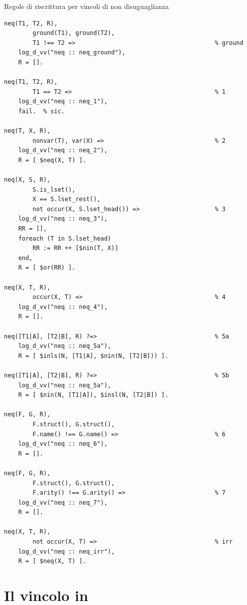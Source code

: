 \documentclass[12pt,a4paper,openright]{book} %
\begin{document}
\begin{algorithm}[H]
	\caption{Regole di riscrittura per vincoli di non disuguaglianza}
	\label{alg:neq_constraints}
\end{algorithm}
\begin{verbatim}
neq(T1, T2, R),
        ground(T1), ground(T2),
    	T1 !== T2 =>                                       % ground
    log_d_vv("neq :: neq_ground"),
    R = [].

neq(T1, T2, R),
        T1 == T2 =>                                        % 1
    log_d_vv("neq :: neq_1"),
    fail.  % sic.

neq(T, X, R),
       	nonvar(T), var(X) =>                               % 2
    log_d_vv("neq :: neq_2"),
    R = [ $neq(X, T) ].

neq(X, S, R),
        S.is_lset(),
        X == S.lset_rest(),
        not occur(X, S.lset_head()) =>                     % 3
    log_d_vv("neq :: neq_3"),
    RR = [],
    foreach (T in S.lset_head)
        RR := RR ++ [$nin(T, X)]
    end,
    R = [ $or(RR) ].

neq(X, T, R),
       	occur(X, T) =>                                     % 4
    log_d_vv("neq :: neq_4"),
    R = [].

neq([T1|A], [T2|B], R) ?=>                                 % 5a
    log_d_vv("neq :: neq_5a"),
    R = [ $inls(N, [T1|A], $nin(N, [T2|B])) ].

neq([T1|A], [T2|B], R) ?=>                                 % 5b
    log_d_vv("neq :: neq_5a"),
    R = [ $nin(N, [T1|A]), $insl(N, [T2|B]) ].

neq(F, G, R),
        F.struct(), G.struct(),
        F.name() !== G.name() =>                           % 6
    log_d_vv("neq :: neq_6"),
    R = [].

neq(F, G, R),
        F.struct(), G.struct(),
        F.arity() !== G.arity() =>                         % 7
    log_d_vv("neq :: neq_7"),
    R = [].

neq(X, T, R),
        not occur(X, T) =>                                 % irr
    log_d_vv("neq :: neq_irr"),
    R = [ $neq(X, T) ].
\end{verbatim}

\section{Il vincolo in}
\end{document}
